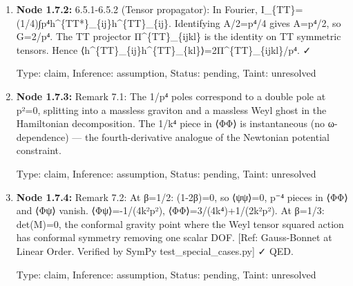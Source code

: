 \documentclass{article}
\begin{document}
\begin{enumerate}
\begin{enumerate}
  Type: claim, Inference: assumption, Status: pending, Taint: unresolved

\item \textbf{Node 1.7.2:} 6.5.1-6.5.2 (Tensor propagator): In Fourier, I\_\{TT\}=(1/4)∫p⁴h\textasciicircum{}\{TT*\}\_\{ij\}h\textasciicircum{}\{TT\}\_\{ij\}. Identifying A/2=p⁴/4 gives A=p⁴/2, so G=2/p⁴. The TT projector Π\textasciicircum{}\{TT\}\_\{ijkl\} is the identity on TT symmetric tensors. Hence ⟨h\textasciicircum{}\{TT\}\_\{ij\}h\textasciicircum{}\{TT\}\_\{kl\}⟩=2Π\textasciicircum{}\{TT\}\_\{ijkl\}/p⁴. ✓

  Type: claim, Inference: assumption, Status: pending, Taint: unresolved

\item \textbf{Node 1.7.3:} Remark 7.1: The 1/p⁴ poles correspond to a double pole at p²=0, splitting into a massless graviton and a massless Weyl ghost in the Hamiltonian decomposition. The 1/k⁴ piece in ⟨ΦΦ⟩ is instantaneous (no ω-dependence) — the fourth-derivative analogue of the Newtonian potential constraint.

  Type: claim, Inference: assumption, Status: pending, Taint: unresolved

\item \textbf{Node 1.7.4:} Remark 7.2: At β=1/2: (1-2β)=0, so ⟨ψψ⟩=0, p⁻⁴ pieces in ⟨ΦΦ⟩ and ⟨Φψ⟩ vanish. ⟨Φψ⟩=-1/(4k²p²), ⟨ΦΦ⟩=3/(4k⁴)+1/(2k²p²). At β=1/3: det(M)=0, the conformal gravity point where the Weyl tensor squared action has conformal symmetry removing one scalar DOF. [Ref: Gauss-Bonnet at Linear Order. Verified by SymPy test\_special\_cases.py] ✓ QED.

  Type: claim, Inference: assumption, Status: pending, Taint: unresolved

\end{enumerate}
\end{enumerate}
\end{document}
